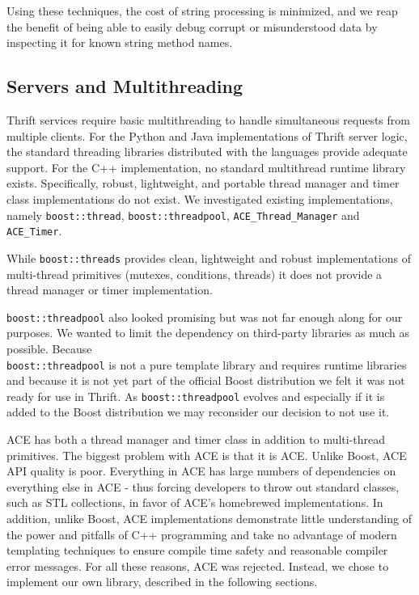\documentclass[nocopyrightspace,blockstyle]{sigplanconf}
\begin{document}
Using these techniques, the cost of string processing is minimized, and we
reap the benefit of being able to easily debug corrupt or misunderstood data by
inspecting it for known string method names.

\subsection{Servers and Multithreading}
Thrift services require basic multithreading to handle simultaneous
requests from multiple clients. For the Python and Java implementations of
Thrift server logic, the standard threading libraries distributed with the
languages provide adequate support. For the C++ implementation, no standard multithread runtime
library exists. Specifically, robust, lightweight, and portable 
thread manager and timer class implementations do not exist. We investigated
existing implementations, namely \texttt{boost::thread}, 
\texttt{boost::threadpool}, \texttt{ACE\_Thread\_Manager} and
\texttt{ACE\_Timer}.  

While \texttt{boost::threads}\cite{boost.threads}  provides clean,
lightweight and robust implementations of multi-thread primitives (mutexes,
conditions, threads) it does not provide a thread manager or timer
implementation.  

\texttt{boost::threadpool}\cite{boost.threadpool} also looked promising but
was not far enough along for our purposes. We wanted to limit the dependency on
third-party libraries as much as possible. Because\\
\texttt{boost::threadpool} is
not a pure template library and requires runtime libraries and because it is
not yet part of the official Boost distribution we felt it was not ready for
use in Thrift. As \texttt{boost::threadpool} evolves and especially if it is
added to the Boost distribution we may reconsider our decision to not use it.

ACE has both a thread manager and timer class in addition to multi-thread
primitives. The biggest problem with ACE is that it is ACE. Unlike Boost, ACE
API quality is poor. Everything in ACE has large numbers of dependencies on
everything else in ACE - thus forcing developers to throw out standard 
classes, such as STL collections, in favor of ACE's homebrewed implementations. In
addition, unlike Boost, ACE implementations demonstrate little understanding
of the power and pitfalls of C++ programming and take no advantage of modern
templating techniques to ensure compile time safety and reasonable compiler
error messages. For all these reasons, ACE was rejected. Instead, we chose
to implement our own library, described in the following sections.
\end{document}
